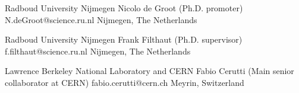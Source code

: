 
\begin{cventries}

\cventry
{Radboud University Nijmegen} %
{Nicolo de Groot {\normalfont\bodyfont\footnotesize (Ph.D. promoter)}} %
{N.deGroot@science.ru.nl} %
{Nijmegen, The Netherlands}
{} %
\vspace{-0.9em}

\cventry
{Radboud University Nijmegen} %
{Frank Filthaut {\normalfont\bodyfont\footnotesize (Ph.D. supervisor)}} %
{f.filthaut@science.ru.nl} %
{Nijmegen, The Netherlands}
{}
\vspace{-0.9em}

\cventry
{Lawrence Berkeley National Laboratory and CERN} %
{Fabio Cerutti {\normalfont\bodyfont\footnotesize (Main senior collaborator at CERN)}} %
{fabio.cerutti@cern.ch} %
{Meyrin, Switzerland}
{}
\vspace{-1.1em}

\end{cventries}
